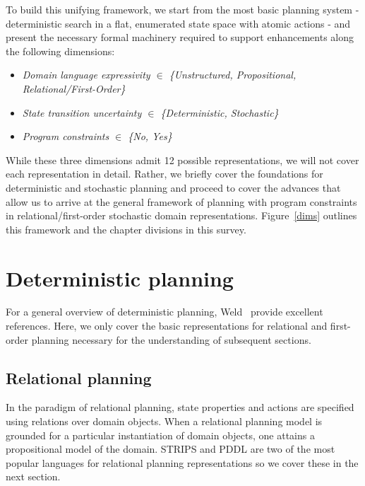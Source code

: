 To build this unifying framework, we start from the most basic
planning system - deterministic search in a flat, enumerated state
space with atomic actions - and present the necessary formal machinery
required to support enhancements along the following dimensions:

\begin{itemize}

\item \emph{Domain language expressivity $\in$ \{Unstructured, Propositional, Relational/First-Order\}}

\item \emph{State transition uncertainty $\in$ \{Deterministic, Stochastic\}}

\item \emph{Program constraints $\in$ \{No, Yes\}}

\end{itemize}

While these three dimensions admit 12 possible representations, we
will not cover each representation in detail.  Rather, we briefly
cover the foundations for deterministic and stochastic planning and proceed
to cover the advances that allow us to arrive at the general framework of
planning with program constraints in relational/first-order stochastic
domain representations.  Figure~\ref{dims} outlines this framework and
the chapter divisions in this survey.

\section{Deterministic planning}

For a general overview of deterministic planning, Weld~\cite{weld:popsurvey,weld:recent}
provide excellent references.
Here, we only cover the basic representations for relational and first-order planning
necessary for the understanding of subsequent sections.

\subsection{Relational planning}

In the paradigm of relational planning, state properties and actions
are specified using relations over domain objects.  When a
relational planning model is grounded for a particular instantiation
of domain objects, one attains a propositional model of the domain.
STRIPS and PDDL are two of the most popular languages for relational
planning representations so we cover these in the next section.

